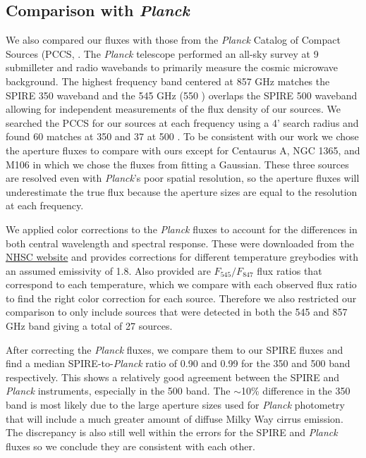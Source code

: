 \subsection{Comparison with \textit{Planck}}
We also compared our fluxes with those from the \textit{Planck} Catalog of Compact Sources (PCCS, \citet{Planck-Collaboration:2013rt}. The \textit{Planck} telescope performed an all-sky survey at 9 submilleter and radio wavebands to primarily measure the cosmic microwave background. The highest frequency band centered at 857 GHz matches the SPIRE 350 \um{} waveband and the 545 GHz (550 \um{}) overlaps the SPIRE 500 \um{} waveband allowing for independent measurements of the flux density of our sources. We searched the PCCS for our sources at each frequency using a 4' search radius and found 60 matches at 350 \um{} and 37 at 500 \um{}. To be consistent with our work we chose the aperture fluxes to compare with ours except for Centaurus A, NGC 1365, and M106 in which we chose the fluxes from fitting a Gaussian. These three sources are resolved even with \textit{Planck}'s poor spatial resolution, so the aperture fluxes will underestimate the true flux because the aperture sizes are equal to the resolution at each frequency. 

We applied color corrections to the \textit{Planck} fluxes to account for the differences in both central wavelength and spectral response. These were downloaded from the \href{https://nhscsci.ipac.caltech.edu/sc/index.php/Spire/PhotDataAnalysis}{NHSC website} and provides corrections for different temperature greybodies with an assumed emissivity of 1.8. Also provided are $F_{545}/F_{847}$ flux ratios that correspond to each temperature, which we compare with each observed flux ratio to find the right color correction for each source. Therefore we also restricted our comparison to only include sources that were detected in both the 545 and 857 GHz band giving a total of 27 sources. 

After correcting the \textit{Planck} fluxes, we compare them to our SPIRE fluxes and find a median SPIRE-to-\textit{Planck} ratio of 0.90 and 0.99 for the 350 and 500 \um{} band respectively. This shows a relatively good agreement between the SPIRE and \textit{Planck} instruments, especially in the 500 \um{} band. The $\sim$10\% difference in the 350 \um{} band is most likely due to the large aperture sizes used for \textit{Planck} photometry that will include a much greater amount of diffuse Milky Way cirrus emission. The discrepancy is also still well within the errors for the SPIRE and \textit{Planck} fluxes so we conclude they are consistent with each other. 